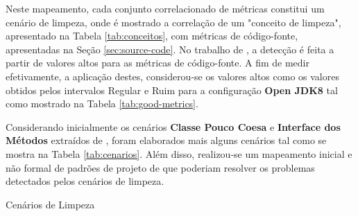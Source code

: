 Neste mapeamento, cada conjunto correlacionado de métricas constitui um cenário de limpeza, onde é mostrado a correlação de um "conceito de limpeza", apresentado na Tabela \ref{tab:conceitos}, com métricas de código-fonte, apresentadas na Seção \ref{sec:source-code}. No trabalho de , a detecção é feita a partir de valores altos para as métricas de código-fonte. A fim de medir efetivamente, a aplicação destes, considerou-se os valores altos como os valores obtidos pelos intervalos Regular e Ruim para a configuração \textbf{Open JDK8} tal como mostrado na Tabela \ref{tab:good-metrics}.  

Considerando inicialmente os cenários \textbf{Classe Pouco Coesa} e \textbf{Interface dos Métodos} extraídos de , foram elaborados mais alguns cenários tal como se mostra na Tabela \ref{tab:cenarios}. Além disso, realizou-se um mapeamento inicial e não formal de padrões de projeto de  que poderiam resolver os problemas detectados pelos cenários de limpeza. 

\begin{table}
\begin{table}[H]
\centering

\caption{Cenários de Limpeza}
\label{tab:cenarios}
\end{table}
\FloatBarrier
\end{table}

